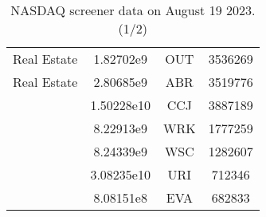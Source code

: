 \begin{table}[ht!]
\begin{tabular}{|c|c|c|c|}
 Real Estate            &   1.82702e9  &   OUT    &     3536269\\
 Real Estate            &   2.80685e9  &   ABR    &     3519776\\ 
                        &   1.50228e10 &   CCJ    &     3887189\\
                        &   8.22913e9  &   WRK    &     1777259\\
                        &   8.24339e9  &   WSC    &     1282607\\
                        &   3.08235e10 &   URI    &      712346\\
                        &   8.08151e8  &   EVA    &      682833\\
 \hline
    \end{tabular}
  \caption{NASDAQ screener data on August 19 2023. (1/2)}
    \label{tab:NASDAQ_1}
\end{table}



